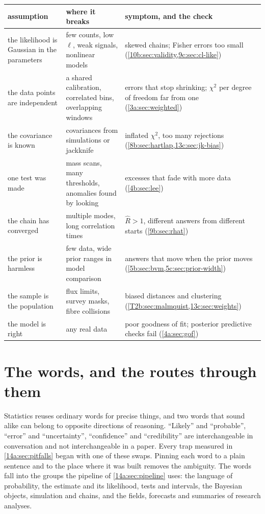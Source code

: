 \begin{taxonomy}
\footnotesize
\renewcommand{\arraystretch}{1.25}
\begin{tabularx}{\linewidth}{@{}>{\raggedright\arraybackslash}p{3.5cm}
  >{\raggedright\arraybackslash}X >{\raggedright\arraybackslash}X@{}}
\toprule
\textbf{assumption} & \textbf{where it breaks} & \textbf{symptom, and the check}\\
\midrule
the likelihood is Gaussian in the parameters & few counts, low $\ell$, weak signals, nonlinear models & skewed chains; Fisher errors too small (\cref{10b:sec:validity,9c:sec:cl-like})\\
the data points are independent & a shared calibration, correlated bins, overlapping windows & errors that stop shrinking; $\chi^2$ per degree of freedom far from one (\cref{3a:sec:weighted})\\
the covariance is known & covariances from simulations or jackknife & inflated $\chi^2$, too many rejections (\cref{8b:sec:hartlap,13c:sec:jk-bias})\\
one test was made & mass scans, many thresholds, anomalies found by looking & excesses that fade with more data (\cref{4b:sec:lee})\\
the chain has converged & multiple modes, long correlation times & $\hat R>1$, different answers from different starts (\cref{9b:sec:rhat})\\
the prior is harmless & few data, wide prior ranges in model comparison & answers that move when the prior moves (\cref{5b:sec:bvm,5c:sec:prior-width})\\
the sample is the population & flux limits, survey masks, fibre collisions & biased distances and clustering (\cref{T2b:sec:malmquist,13c:sec:weights})\\
the model is right & any real data & poor goodness of fit; posterior predictive checks fail (\cref{4a:sec:gof})\\
\bottomrule
\end{tabularx}
\end{taxonomy}
\section{The words, and the routes through them}\label{14a:sec:glossary}

Statistics reuses ordinary words for precise things, and two words that sound alike
can belong to opposite directions of reasoning. ``Likely'' and ``probable'',
``error'' and ``uncertainty'', ``confidence'' and ``credibility'' are interchangeable in
conversation and not interchangeable in a paper. Every trap measured in
\cref{14a:sec:pitfalls} began with one of these swaps. Pinning each word to a plain
sentence and to the place where it was built removes the ambiguity. The words fall
into the groups the pipeline of \cref{14a:sec:pipeline} uses: the language of
probability, the estimate and its likelihood, tests and intervals, the Bayesian
objects, simulation and chains, and the fields, forecasts and summaries of research
analyses.


